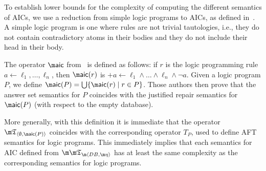 
To establish lower bounds for the complexity of computing the different semantics of AICs, we use a reduction from simple logic programs to AICs, as defined in~\cite{tplp/CaropreseT11}.
A simple logic program is one where rules are not trivial tautologies, i.e., they do not contain contradictory atoms in their bodies and they do not include their head in their body.

The operator $\aicop$ from~\cite{tplp/CaropreseT11} is defined as follows: if $r$ is the logic programming rule $a\leftarrow \ell_1,\ldots,\ell_n$, then $\aicop(r)$ is ${+a}\leftarrow \ell_1\wedge\ldots\wedge\ell_n\wedge\neg a$.
Given a logic program $P$, we define $\aicop(P)=\bigcup\{\aicop(r)\mid r\in P\}$.
Those authors then prove that the answer set semantics for $P$ coincides with the justified repair semantics for $\aicop(P)$ (with respect to the empty database).

More generally, with this definition it is immediate that the operator $\threeap_{\langle\emptyset,\aicop(P)\rangle}$ coincides with the corresponding operator $T_P$, used to define AFT semantics for logic programs.
This immediately implies that each semantics for AIC defined from $\Apfull$ has at least the same complexity as the corresponding semantics for logic programs.

